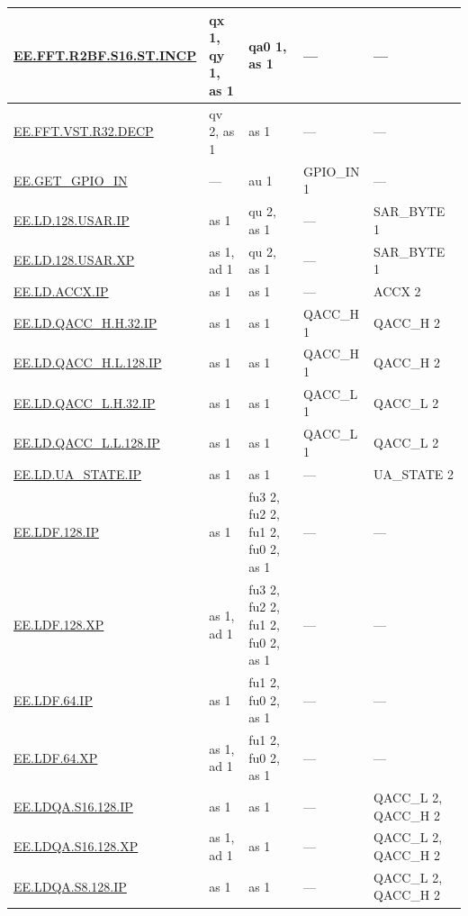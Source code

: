 \begin{longtable}[c]{|l|m{2.5cm}|m{2.5cm}|m{2.5cm}|m{2.5cm}|}
    \hyperref[instruction:EEFFTR2BFS16STINCP]{EE.FFT.R2BF.S16.ST.INCP} & qx 1, qy 1, as 1 & qa0 1, as 1 & — & — \\\hline
    \hyperref[instruction:EEFFTVSTR32DECP]{EE.FFT.VST.R32.DECP} & qv 2, as 1 & as 1 & — & — \\\hline
    \hyperref[instruction:EEGETGPIOIN]{EE.GET\_GPIO\_IN} & — & au 1 & GPIO\_IN 1 & — \\\hline
    \hyperref[instruction:EELD128USARIP]{EE.LD.128.USAR.IP} & as 1 & qu 2, as 1 & — & SAR\_BYTE 1\\\hline
    \hyperref[instruction:EELD128USARXP]{EE.LD.128.USAR.XP} & as 1, ad 1 & qu 2, as 1 & — & SAR\_BYTE 1\\\hline
    \hyperref[instruction:EELDACCXIP]{EE.LD.ACCX.IP} & as 1 & as 1 & — & ACCX 2\\\hline
    \hyperref[instruction:EELDQACCHH32IP]{EE.LD.QACC\_H.H.32.IP} & as 1 & as 1 & QACC\_H 1 & QACC\_H 2\\\hline
    \hyperref[instruction:EELDQACCHL128IP]{EE.LD.QACC\_H.L.128.IP} & as 1 & as 1 & QACC\_H 1 & QACC\_H 2\\\hline
    \hyperref[instruction:EELDQACCLH32IP]{EE.LD.QACC\_L.H.32.IP} & as 1 & as 1 & QACC\_L 1 & QACC\_L 2\\\hline
    \hyperref[instruction:EELDQACCLL128IP]{EE.LD.QACC\_L.L.128.IP} & as 1 & as 1 & QACC\_L 1 & QACC\_L 2\\\hline
    \hyperref[instruction:EELDUASTATEIP]{EE.LD.UA\_STATE.IP} & as 1 & as 1 & — & UA\_STATE 2\\\hline
    \hyperref[instruction:EELDF128IP]{EE.LDF.128.IP} & as 1 & fu3 2, fu2 2, fu1 2, fu0 2, as 1 & — & — \\\hline
    \hyperref[instruction:EELDF128XP]{EE.LDF.128.XP} & as 1, ad 1 & fu3 2, fu2 2, fu1 2, fu0 2, as 1 & — & — \\\hline
    \hyperref[instruction:EELDF64IP]{EE.LDF.64.IP} & as 1 & fu1 2, fu0 2, as 1 & — & — \\\hline
    \hyperref[instruction:EELDF64XP]{EE.LDF.64.XP} & as 1, ad 1 & fu1 2, fu0 2, as 1 & — & — \\\hline
    \hyperref[instruction:EELDQAS16128IP]{EE.LDQA.S16.128.IP} & as 1 & as 1 & — & QACC\_L 2, QACC\_H 2\\\hline
    \hyperref[instruction:EELDQAS16128XP]{EE.LDQA.S16.128.XP} & as 1, ad 1 & as 1 & — & QACC\_L 2, QACC\_H 2\\\hline
    \hyperref[instruction:EELDQAS8128IP]{EE.LDQA.S8.128.IP} & as 1 & as 1 & — & QACC\_L 2, QACC\_H 2\\\hline

\end{longtable}
